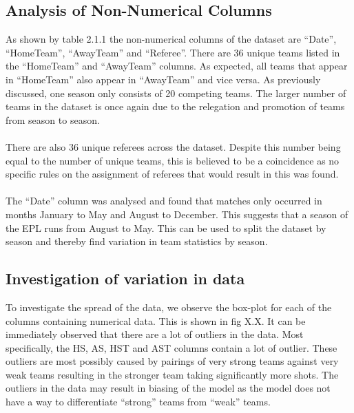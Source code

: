 \documentclass[a4paper,12pt]{article}
\begin{document}
	\subsection{Analysis of Non-Numerical Columns}
	
	As shown by table 2.1.1 the non-numerical columns of the dataset are “Date”, “HomeTeam”, “AwayTeam” and “Referee”. There are 36 unique teams listed in the “HomeTeam” and “AwayTeam” columns. As expected, all teams that appear in “HomeTeam” also appear in “AwayTeam” and vice versa. As previously discussed, one season only consists of 20 competing teams. The larger number of teams in the dataset is once again due to the relegation and promotion of teams from season to season.\\
	\\
	There are also 36 unique referees across the dataset. Despite this number being equal to the number of unique teams, this is believed to be a coincidence as no specific rules on the assignment of referees that would result in this was found.\\
	\\
	The “Date” column was analysed and found that matches only occurred in months January to May and August to December. This suggests that a season of the EPL runs from August to May. This can be used to split the dataset by season and thereby find variation in team statistics by season.  
	
	\subsection{Investigation of variation in data}
	
	To investigate the spread of the data, we observe the box-plot for each of the columns containing numerical data. This is shown in fig X.X.  It can be immediately observed that there are a lot of outliers in the data. Most specifically, the HS, AS, HST and AST columns contain a lot of outlier. These outliers are most possibly caused by pairings of very strong teams against very weak teams resulting in the stronger team taking significantly more shots. The outliers in the data may result in biasing of the model as the model does not have a way to differentiate “strong” teams from “weak” teams. 
	
\end{document}
